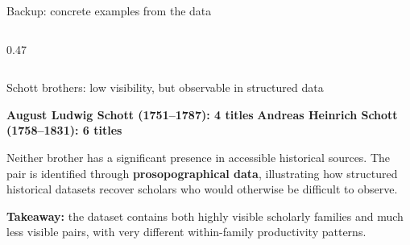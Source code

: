 \documentclass[aspectratio=169,10pt]{beamer}
\begin{document}
\begin{frame}{Backup: concrete examples from the data}
\begin{columns}[T,onlytextwidth]
\begin{column}{0.47\textwidth}
\end{column}

\end{columns}

\vspace{0.30em}

\begin{block}{Schott brothers: low visibility, but observable in structured data}
\footnotesize

\textbf{August Ludwig Schott (1751--1787): 4 titles}
\qquad
\textbf{Andreas Heinrich Schott (1758--1831): 6 titles}

\vspace{0.12em}

Neither brother has a significant presence in accessible historical sources.
The pair is identified through \textbf{prosopographical data}, illustrating how structured
historical datasets recover scholars who would otherwise be difficult to observe.

\end{block}

\vspace{0.15em}

{\footnotesize
\textbf{\color{FormalNavy}Takeaway:}
the dataset contains both highly visible scholarly families and much less visible pairs,
with very different within-family productivity patterns.
}

\end{frame}




\end{document}
